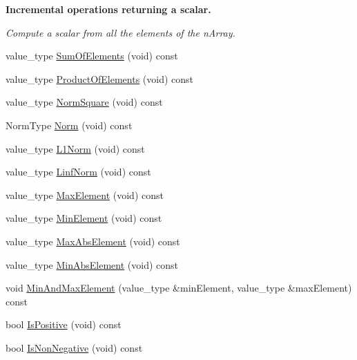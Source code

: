 \begin{Indent}{\bf Incremental operations returning a scalar.}\par
{\em Compute a scalar from all the elements of the n\+Array. }\begin{DoxyCompactItemize}
\item 
value\+\_\+type \hyperlink{classvct_dynamic_const_n_array_base_a57b568c584c363c2811e5c1020484a57}{Sum\+Of\+Elements} (void) const 
\item 
value\+\_\+type \hyperlink{classvct_dynamic_const_n_array_base_af46f916cfbd94c520eab783e89377232}{Product\+Of\+Elements} (void) const 
\item 
value\+\_\+type \hyperlink{classvct_dynamic_const_n_array_base_adb4a5b2ba7dd8a5814756dd1d156418f}{Norm\+Square} (void) const 
\item 
Norm\+Type \hyperlink{classvct_dynamic_const_n_array_base_a817b97a96452a366917e8192ce79bd1d}{Norm} (void) const 
\item 
value\+\_\+type \hyperlink{classvct_dynamic_const_n_array_base_ad40fd31ef428487dae1ebba1191f7931}{L1\+Norm} (void) const 
\item 
value\+\_\+type \hyperlink{classvct_dynamic_const_n_array_base_ac1fe0f248814f603db02bb7d7d6d7bed}{Linf\+Norm} (void) const 
\item 
value\+\_\+type \hyperlink{classvct_dynamic_const_n_array_base_a0a81dadfe1f7fb3fdc4c7c5b345a51da}{Max\+Element} (void) const 
\item 
value\+\_\+type \hyperlink{classvct_dynamic_const_n_array_base_a3835074720e7ac6fc54ac47afa9aa4e9}{Min\+Element} (void) const 
\item 
value\+\_\+type \hyperlink{classvct_dynamic_const_n_array_base_ae89d2f8d6e7a3437a03a4fd2ab5345b4}{Max\+Abs\+Element} (void) const 
\item 
value\+\_\+type \hyperlink{classvct_dynamic_const_n_array_base_a93595c4cdf9c5954bfd67951490eeb64}{Min\+Abs\+Element} (void) const 
\item 
void \hyperlink{classvct_dynamic_const_n_array_base_aed4934d1e01e31ed89e7f1cff84b1f1e}{Min\+And\+Max\+Element} (value\+\_\+type \&min\+Element, value\+\_\+type \&max\+Element) const 
\item 
bool \hyperlink{classvct_dynamic_const_n_array_base_aab97f28208b7261a5946e3ead1649817}{Is\+Positive} (void) const 
\item 
bool \hyperlink{classvct_dynamic_const_n_array_base_a80f711e9249e3ceede696133bef1025f}{Is\+Non\+Negative} (void) const 
\item 

\end{DoxyCompactItemize}
\end{Indent}
